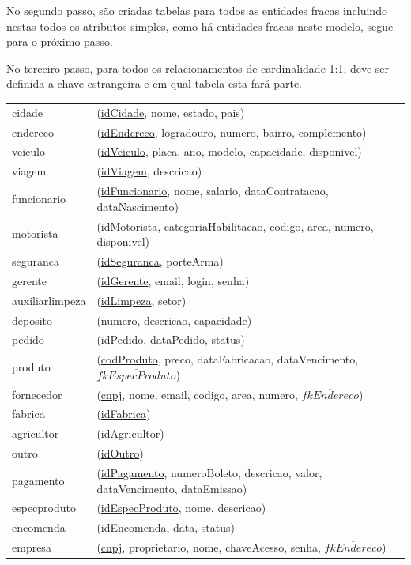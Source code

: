 \documentclass[12pt, onecolumn, titlepage]{article}
\begin{document}
No segundo passo, são criadas tabelas para todos as entidades fracas incluindo nestas todos os atributos simples, como há entidades fracas neste modelo, segue para o próximo passo.

No terceiro passo, para todos os relacionamentos de cardinalidade 1:1, deve ser definida a chave estrangeira e em qual tabela esta fará parte.

\begin{table}[htb!]
\begin{center}
\begin{tabular}{p{2.5cm} p{10.5cm}}
cidade & (\underline{idCidade}, nome, estado, pais) \\
endereco & (\underline{idEndereco}, logradouro, numero, bairro, complemento) \\
veiculo & (\underline{idVeiculo}, placa, ano, modelo, capacidade, disponivel) \\
viagem & (\underline{idViagem}, descricao) \\
funcionario & (\underline{idFuncionario}, nome, salario, dataContratacao, dataNascimento)\\
motorista & (\underline{idMotorista}, categoriaHabilitacao, codigo, area, numero, disponivel)\\
seguranca & (\underline{idSeguranca}, porteArma)\\
gerente & (\underline{idGerente}, email, login, senha)\\
auxiliarlimpeza & (\underline{idLimpeza}, setor)\\
deposito & (\underline{numero}, descricao, capacidade)\\
pedido & (\underline{idPedido}, dataPedido, status)\\
produto & (\underline{codProduto}, preco, dataFabricacao, dataVencimento, $\overline{fkEspecProduto}$)\\
fornecedor & (\underline{cnpj}, nome, email, codigo, area, numero, $\overline{fkEndereco}$)\\
fabrica & (\underline{idFabrica})\\
agricultor & (\underline{idAgricultor})\\
outro & (\underline{idOutro})\\
pagamento & (\underline{idPagamento}, numeroBoleto, descricao, valor, dataVencimento, dataEmissao)\\
especproduto & (\underline{idEspecProduto}, nome, descricao)\\
encomenda & (\underline{idEncomenda}, data, status)\\
empresa & (\underline{cnpj}, proprietario, nome, chaveAcesso, senha, $\overline{fkEndereco}$)
\end{tabular}
\end{center}
\end{table}
\end{document}
